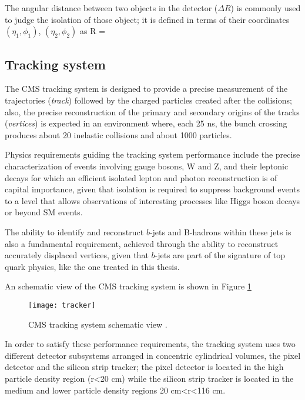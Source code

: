 The angular distance between two objects in the detector ($\Delta R$) is commonly used to judge the isolation of those object; it is defined in terms of their coordinates $(\eta_1,\phi_1)$, $(\eta_2,\phi_2)$ as
\beqn
\Delta R = 
\label{delta_r}
\eeqn

\subsection{Tracking system}

The CMS tracking system is designed to provide a precise measurement of the trajectories (\textit{track}) followed by the charged particles created after the \pp collisions; also, the precise reconstruction of the primary and secondary origins of the tracks (\textit{vertices}) is expected in an environment where, each 25 ns, the bunch crossing produces about 20 inelastic collisions and about 1000 particles.%

Physics requirements guiding the tracking system performance include the precise characterization of events involving gauge bosons, W and Z, and their leptonic decays for which an efficient isolated lepton and photon reconstruction is of capital importance, given that isolation is required to suppress background events to a level that allows observations of interesting processes like Higgs boson decays or beyond SM events.

The ability to identify and reconstruct $b$-jets and B-hadrons within these jets is also a fundamental requirement, achieved through the ability to reconstruct accurately displaced vertices, given that $b$-jets are part of the signature of top quark physics, like the one treated in this thesis.

An schematic view of the CMS tracking system is shown in Figure \ref{fig:tracker} 

\begin{figure}[h!]
  \centering
  \texttt{[image: tracker]}
  \caption[CMS tracking system schematic view.]{CMS tracking system schematic view \cite{tracker}.}
  \label{fig:tracker}
\end{figure}

In order to satisfy these performance requirements, the tracking system uses two different detector subsystems arranged in concentric cylindrical volumes, the pixel detector and the silicon strip tracker; the pixel detector is located in the high particle density region (r<20 cm) while the silicon strip tracker is located in the medium and lower particle density regions 20 cm<r<116 cm.        

